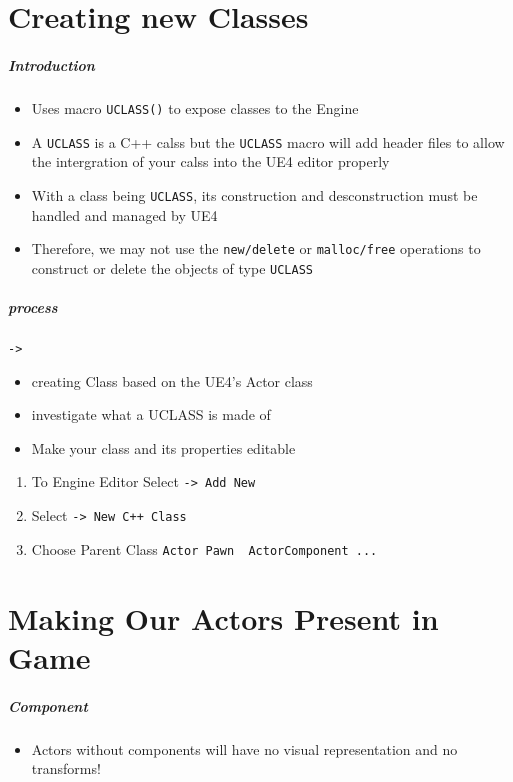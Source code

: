 \documentclass[UTF8,a4paper,12pt]{ctexbook}
\begin{document}
	\section{Creating new Classes}
		\subparagraph{Introduction}
			\begin{itemize}[itemindent = 2em]
				\item Uses macro \verb|UCLASS()| to expose classes to the Engine
				\item A \verb|UCLASS| is a C++ calss but the \verb|UCLASS| macro will add header files to allow the intergration of your calss into the UE4 editor properly
				\item With a class being \verb|UCLASS|, its construction and desconstruction must be handled and managed by UE4
				\item Therefore, we may not use the \verb|new/delete| or \verb|malloc/free| operations to construct or delete the objects of type \verb|UCLASS|
			\end{itemize}
			
		\subparagraph{process}
			\verb|->|
			
				\begin{itemize}[itemindent = 2em ]
					\item creating Class based on the UE4's Actor class
					
					\item investigate what a UCLASS is made of
					
					\item Make your class and its properties editable
				\end{itemize}
			
			
			\begin{enumerate}[itemindent = 2em]
				\item To Engine Editor Select \verb|-> Add New|
				\item Select \verb|-> New C++ Class|
				\item Choose Parent Class \verb|Actor Pawn  ActorComponent ...|
			\end{enumerate}
	
	
	
	\section{Making Our Actors Present in Game}	
		\subparagraph{Component}
			\begin{itemize}[itemindent = 2em]
				\item Actors without components will have no visual representation and no transforms!
			\end{itemize}
	
\end{document}
